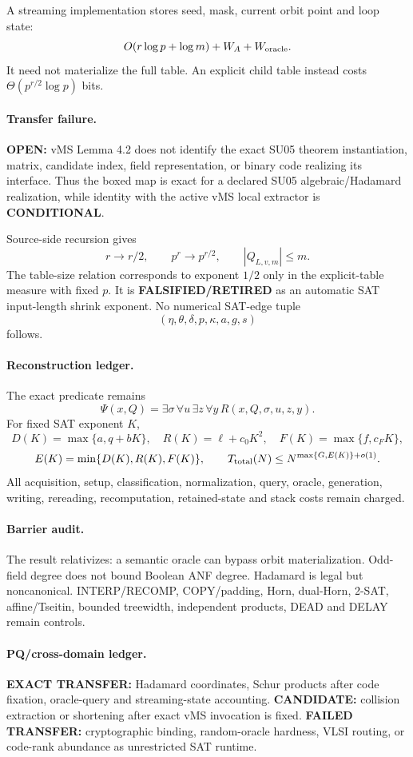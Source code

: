 \documentclass[11pt]{article}
\begin{document}
A streaming implementation stores seed, mask, current orbit point and loop state:
\[
O(r\log p+\log m)+W_A+W_{\rm oracle}.
\]
It need not materialize the full table. An explicit child table instead costs \(\Theta(p^{r/2}\log p)\) bits.

\paragraph{Transfer failure.}
\textbf{OPEN:} vMS Lemma 4.2 does not identify the exact SU05 theorem instantiation, matrix, candidate index, field representation, or binary code realizing its interface. Thus the boxed map is exact for a declared SU05 algebraic/Hadamard realization, while identity with the active vMS local extractor is \textbf{CONDITIONAL}.

Source-side recursion gives
\[
r\to r/2,\qquad p^r\to p^{r/2},\qquad |Q_{L,v,m}|\le m.
\]
The table-size relation corresponds to exponent \(1/2\) only in the explicit-table measure with fixed \(p\). It is \textbf{FALSIFIED/RETIRED} as an automatic SAT input-length shrink exponent. No numerical SAT-edge tuple
\[
(\eta,\theta,\delta,p,\kappa,a,g,s)
\]
follows.

\paragraph{Reconstruction ledger.}
The exact predicate remains
\[
\Psi(x,Q)=\exists\sigma\,\forall u\,\exists z\,\forall y\,R(x,Q,\sigma,u,z,y).
\]
For fixed SAT exponent \(K\),
\[
D(K)=\max\{a,q+bK\},\quad R(K)=\ell+c_0K^2,\quad
F(K)=\max\{f,c_FK\},
\]
\[
E(K)=\min\{D(K),R(K),F(K)\},\qquad
T_{\rm total}(N)\le N^{\max\{G,E(K)\}+o(1)}.
\]
All acquisition, setup, classification, normalization, query, oracle, generation, writing, rereading, recomputation, retained-state and stack costs remain charged.

\paragraph{Barrier audit.}
The result relativizes: a semantic oracle can bypass orbit materialization. Odd-field degree does not bound Boolean ANF degree. Hadamard is legal but noncanonical. INTERP/RECOMP, COPY/padding, Horn, dual-Horn, 2-SAT, affine/Tseitin, bounded treewidth, independent products, DEAD and DELAY remain controls.

\paragraph{PQ/cross-domain ledger.}
\textbf{EXACT TRANSFER:} Hadamard coordinates, Schur products after code fixation, oracle-query and streaming-state accounting.
\textbf{CANDIDATE:} collision extraction or shortening after exact vMS invocation is fixed.
\textbf{FAILED TRANSFER:} cryptographic binding, random-oracle hardness, VLSI routing, or code-rank abundance as unrestricted SAT runtime.
\end{document}
